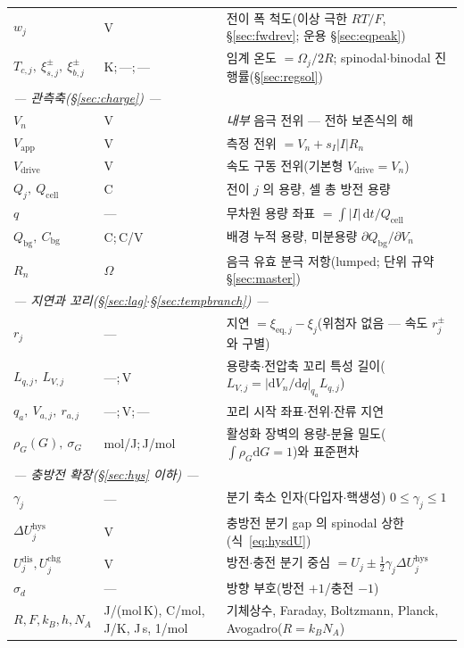 \documentclass[11pt,a4paper]{article}
\newcommand{\dd}{\mathrm{d}}
\newcommand{\eq}{\mathrm{eq}}
\newcommand{\app}{\mathrm{app}}
\newcommand{\drive}{\mathrm{drive}}
\newcommand{\cell}{\mathrm{cell}}
\newcommand{\bg}{\mathrm{bg}}
\newcommand{\dis}{\mathrm{dis}}
\newcommand{\chg}{\mathrm{chg}}
\newcommand{\hys}{\mathrm{hys}}
\begin{document}
\begin{longtable}{p{} p{} p{}}
$w_j$ & V & 전이 폭 척도(이상 극한 $RT/F$, \S\ref{sec:fwdrev}; 운용 \S\ref{sec:eqpeak}) \\
$T_{c,j},\ \xi_{s,j}^\pm,\ \xi_{b,j}^\pm$ & {\footnotesize K;\,---;\,---} & 임계 온도 $=\Omega_j/2R$; spinodal$\cdot$binodal 진행률(\S\ref{sec:regsol}) \\
\multicolumn{3}{l}{\emph{— 관측축(\S\ref{sec:charge}) —}}\\
$V_n$ & V & \emph{내부} 음극 전위 — 전하 보존식의 해 \\
$V_\app$ & V & 측정 전위 $=V_n+s_I|I|R_n$ \\
$V_\drive$ & V & 속도 구동 전위(기본형 $V_\drive=V_n$) \\
$Q_j,\ Q_\cell$ & C & 전이 $j$ 의 용량, 셀 총 방전 용량 \\
$q$ & --- & 무차원 용량 좌표 $=\int|I|\,\dd t/Q_\cell$ \\
$Q_\bg,\ C_\bg$ & C;\,C/V & 배경 누적 용량, 미분용량 $\partial Q_\bg/\partial V_n$ \\
$R_n$ & $\Omega$ & 음극 유효 분극 저항(lumped; 단위 규약 \S\ref{sec:master}) \\
\multicolumn{3}{l}{\emph{— 지연과 꼬리(\S\ref{sec:lag}$\cdot$\S\ref{sec:tempbranch}) —}}\\
$r_j$ & --- & 지연 $=\xi_{\eq,j}-\xi_j$(위첨자 없음 — 속도 $r_j^\pm$ 와 구별) \\
$L_{q,j},\ L_{V,j}$ & ---;\,V & 용량축$\cdot$전압축 꼬리 특성 길이($L_{V,j}=|\dd V_n/\dd q|_{q_a}L_{q,j}$) \\
$q_a,\ V_{a,j},\ r_{a,j}$ & ---;\,V;\,--- & 꼬리 시작 좌표$\cdot$전위$\cdot$잔류 지연 \\
$\rho_G(G),\ \sigma_G$ & mol/J;\,J/mol & 활성화 장벽의 용량-분율 밀도($\int\rho_G\dd G=1$)와 표준편차 \\
\multicolumn{3}{l}{\emph{— 충방전 확장(\S\ref{sec:hys} 이하) —}}\\
$\gamma_j$ & --- & 분기 축소 인자(다입자$\cdot$핵생성) $0\le\gamma_j\le1$ \\
$\Delta U_j^\hys$ & V & 충방전 분기 gap 의 spinodal 상한(식~\eqref{eq:hysdU}) \\
$U_j^{\dis},U_j^{\chg}$ & V & 방전$\cdot$충전 분기 중심 $=U_j\pm\tfrac12\gamma_j\Delta U_j^\hys$ \\
$\sigma_d$ & --- & 방향 부호(방전 $+1$/충전 $-1$) \\
$R,F,k_B,h,N_A$ & {\footnotesize J/(mol\,K), C/mol, J/K, J\,s, 1/mol} & 기체상수, Faraday, Boltzmann, Planck, Avogadro($R=k_BN_A$) \\
\bottomrule
\end{longtable}
\end{document}
